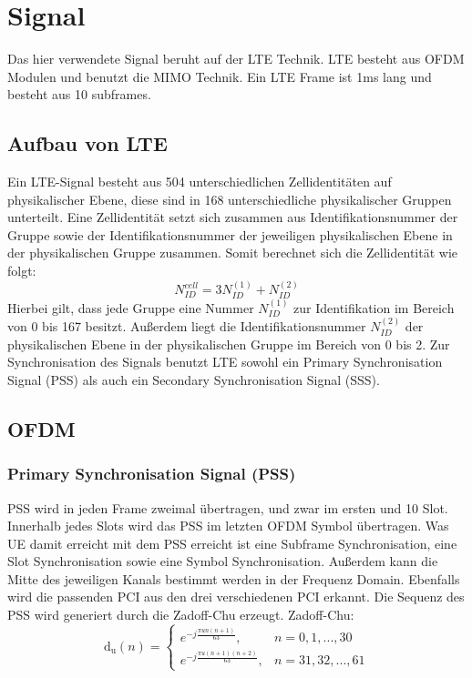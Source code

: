 \section{Signal}
Das hier verwendete Signal beruht auf der LTE Technik. LTE besteht aus OFDM Modulen und benutzt die MIMO Technik. Ein LTE Frame ist 1ms lang und besteht aus 10 subframes.
\subsection{Aufbau von LTE}
Ein LTE-Signal besteht aus 504 unterschiedlichen Zellidentitäten auf physikalischer Ebene, diese sind in 168 unterschiedliche physikalischer Gruppen unterteilt. Eine Zellidentität setzt sich zusammen aus Identifikationsnummer der Gruppe sowie der Identifikationsnummer der jeweiligen physikalischen Ebene in der physikalischen Gruppe zusammen. Somit berechnet sich die Zellidentität wie folgt: $$N_{ID}^{cell}=3N_{ID}^{(1)}+N_{ID}^{(2)}$$ Hierbei gilt, dass jede Gruppe eine Nummer $N_{ID}^{(1)}$ zur Identifikation im Bereich von 0 bis 167 besitzt. Außerdem liegt die Identifikationsnummer $N_{ID}^{(2)}$ der physikalischen Ebene in der physikalischen Gruppe im Bereich von 0 bis 2.
Zur Synchronisation des Signals benutzt LTE sowohl ein Primary Synchronisation Signal (PSS) als auch ein Secondary Synchronisation Signal (SSS).~\cite[S.~180]{etsi2021136}
\subsection{OFDM}
\begin{figure}
    \centering
\end{figure}

\subsubsection{Primary Synchronisation Signal (PSS)}
 PSS wird in jeden Frame zweimal übertragen, und zwar im ersten und 10 Slot. Innerhalb jedes Slots wird das PSS im letzten OFDM Symbol übertragen. Was UE damit erreicht mit dem PSS erreicht ist eine Subframe Synchronisation, eine Slot Synchronisation sowie eine Symbol Synchronisation. Außerdem kann die Mitte des jeweiligen Kanals bestimmt werden in der Frequenz Domain. Ebenfalls wird die passenden PCI aus den drei verschiedenen PCI erkannt.
 Die Sequenz des PSS wird generiert durch die Zadoff-Chu erzeugt. Zadoff-Chu: $$ 	\operatorname{d_u}(n)=\begin{cases} e^{-j\frac{\pi un(n+1)}{63}}, & n=0,1,...,30 \\ e^{-j\frac{\pi u(n+1)(n+2)}{63}}, & n=31,32,...,61 \end{cases}$$~\cite[S.~181]{etsi2021136} 
